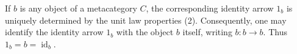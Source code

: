If $b$ is any object of a metacategory $C$, the corresponding identity arrow $1_b$ is uniquely determined by the unit law properties (2). Consequently, one may identify the identity arrow $1_b$ with the object $b$ itself, writing $b: b \rightarrow b$. Thus $1_b = b = \operatorname{id}_b$.
